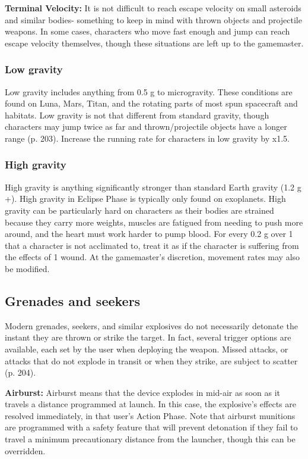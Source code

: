 \textbf{Terminal Velocity:} It is not difficult to reach escape velocity on small asteroids and similar bodies- something to keep in mind with thrown objects and projectile weapons. In some cases, characters who move fast enough and jump can reach escape velocity themselves, though these situations are left up to the gamemaster.

\subsubsection{Low gravity}

Low gravity includes anything from 0.5 g to microgravity. These conditions are found on Luna, Mars, Titan, and the rotating parts of most spun spacecraft and habitats. Low gravity is not that different from standard gravity, though characters may jump twice as far and thrown/projectile objects have a longer range (p. 203). Increase the running rate for characters in low gravity by x1.5.

\subsubsection{High gravity}

High gravity is anything significantly stronger than standard Earth gravity (1.2 g +). High gravity in Eclipse Phase is typically only found on exoplanets. High gravity can be particularly hard on characters as their bodies are strained because they carry more weights, muscles are fatigued from needing to push more around, and the heart must work harder to pump blood. For every 0.2 g over 1 that a character is not acclimated to, treat it as if the character is suffering from the effects of 1 wound. At the gamemaster’s discretion, movement rates may also be modified.

\subsection{Grenades and seekers}
\label{sec:combat-grenades-seekers}

Modern grenades, seekers, and similar explosives do not necessarily detonate the instant they are thrown or strike the target. In fact, several trigger options are available, each set by the user when deploying the weapon. Missed attacks, or attacks that do not explode in transit or when they strike, are subject to scatter (p. 204).

\textbf{Airburst:} Airburst means that the device explodes in mid-air as soon as it travels a distance programmed at launch. In this case, the explosive’s effects are resolved immediately, in that user’s Action Phase. Note that airburst munitions are programmed with a safety feature that will prevent detonation if they fail to travel a minimum precautionary distance from the launcher, though this can be overridden.

